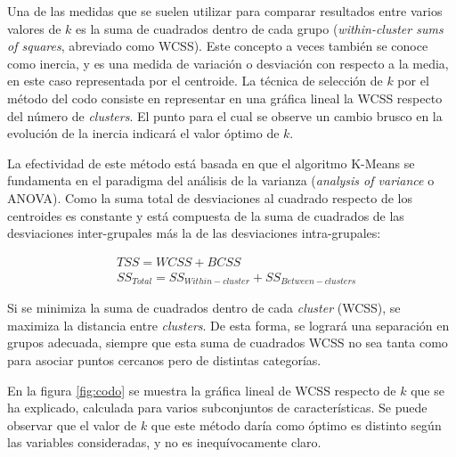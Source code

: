 Una de las medidas que se suelen utilizar para comparar resultados entre varios valores de $k$ es la suma de cuadrados dentro de cada grupo (\emph{within-cluster sums of squares}, abreviado como WCSS).
Este concepto a veces también se conoce como inercia, y es una medida de variación o desviación con respecto a la media, en este caso representada por el centroide.
La técnica de selección de $k$ por el método del codo consiste en representar en una gráfica lineal la WCSS respecto del número de \emph{clusters}.
El punto para el cual se observe un cambio brusco en la evolución de la inercia indicará el valor óptimo de $k$.

La efectividad de este método está basada en que el algoritmo K-Means se fundamenta en el paradigma del análisis de la varianza (\emph{analysis of variance} o ANOVA).
Como la suma total de desviaciones al cuadrado respecto de los centroides es constante y está compuesta de la suma de cuadrados de las desviaciones inter-grupales más la de las desviaciones intra-grupales:

\begin{eqnarray*}
    & TSS = WCSS + BCSS \\
    & SS_{Total} = SS_{Within-cluster} + SS_{Between-clusters}
\end{eqnarray*}

Si se minimiza la suma de cuadrados dentro de cada \emph{cluster} (WCSS), se maximiza la distancia entre \emph{clusters}.
De esta forma, se logrará una separación en grupos adecuada, siempre que esta suma de cuadrados WCSS no sea tanta como para asociar puntos cercanos pero de distintas categorías.

En la figura \ref{fig:codo} se muestra la gráfica lineal de WCSS respecto de $k$ que se ha explicado, calculada para varios subconjuntos de características.
Se puede observar que el valor de $k$ que este método daría como óptimo es distinto según las variables consideradas, y no es inequívocamente claro.

